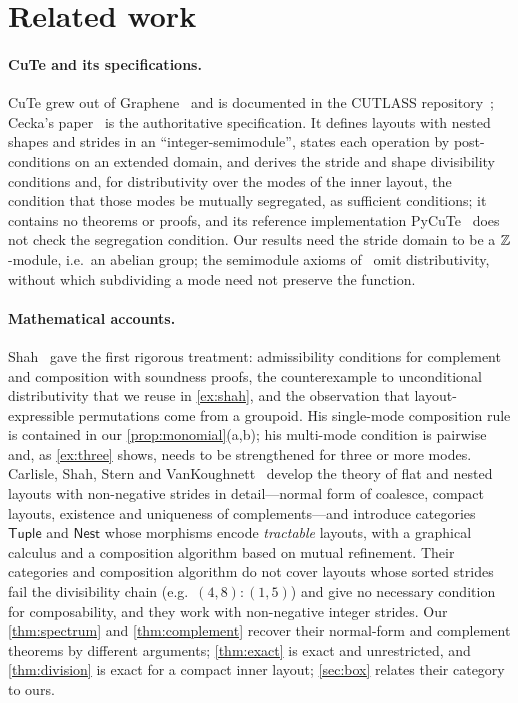 \section{Related work}\label{sec:related}

\paragraph{CuTe and its specifications.}
CuTe grew out of Graphene~\cite{hagedorn2023} and is documented in the CUTLASS
repository~\cite{cutedocs}; Cecka's paper~\cite{cecka2026} is the authoritative specification. It
defines layouts with nested shapes and strides in an ``integer-semimodule'', states each operation
by post-conditions on an extended domain, and derives the stride and shape divisibility conditions
and, for distributivity over the modes of the inner layout, the condition that those modes be
mutually segregated, as sufficient conditions; it contains no theorems or proofs, and its
reference implementation PyCuTe~\cite{pycute} does not check the segregation condition. Our results need the stride domain to be a $\mathbb{Z}$-module, i.e.\ an
abelian group; the semimodule axioms of~\cite{cecka2026} omit distributivity, without which
subdividing a mode need not preserve the function.

\paragraph{Mathematical accounts.}
Shah~\cite{shah2024} gave the first rigorous treatment: admissibility conditions for complement
and composition with soundness proofs, the counterexample to unconditional distributivity that we
reuse in \cref{ex:shah}, and the observation that layout-expressible permutations come from a
groupoid. His single-mode composition rule is contained in our \cref{prop:monomial}(a,b); his
multi-mode
condition is pairwise and, as \cref{ex:three} shows, needs to be strengthened for three or more
modes.
Carlisle, Shah, Stern and VanKoughnett~\cite{carlisle2026} develop the theory of flat and nested
layouts with non-negative strides in detail---normal form of coalesce, compact layouts,
existence and uniqueness of complements---and introduce categories $\mathsf{Tuple}$ and
$\mathsf{Nest}$ whose morphisms encode \emph{tractable} layouts, with a graphical calculus and a
composition algorithm based on mutual refinement. Their categories and composition algorithm do
not cover layouts whose sorted strides fail the divisibility chain (e.g.\ $(4,8):(1,5)$) and give
no necessary condition for composability, and they work with non-negative integer strides. Our \cref{thm:spectrum} and
\cref{thm:complement} recover their normal-form and complement theorems by different arguments;
\cref{thm:exact} is exact and unrestricted, and \cref{thm:division} is exact for a compact inner
layout; \cref{sec:box} relates their category to ours.

